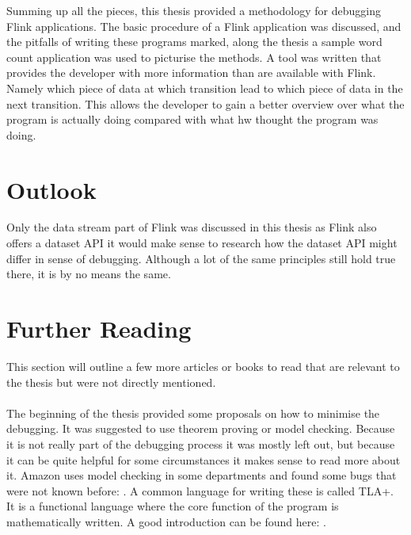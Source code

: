 Summing up all the pieces, this thesis provided a methodology for debugging Flink applications. The basic procedure of a Flink application was discussed, and the pitfalls of writing these programs marked, along the thesis a sample word count application was used to picturise the methods. A tool was written that provides the developer with more information than are available with Flink. Namely which piece of data at which transition lead to which piece of data in the next transition. This allows the developer to gain a better overview over what the program is actually doing compared with what hw thought the program was doing.

\section{Outlook}
Only the data stream part of Flink was discussed in this thesis as Flink also offers a dataset API it would make sense to research how the dataset API might differ in sense of debugging. Although a lot of the same principles still hold true there, it is by no means the same.

\section{Further Reading}
This section will outline a few more articles or books to read that are relevant to the thesis but were not directly mentioned.

\paragraph{} The beginning of the thesis provided some proposals on how to minimise the debugging. It was suggested to use theorem proving or model checking. Because it is not really part of the debugging process it was mostly left out, but because it can be quite helpful for some circumstances it makes sense to read more about it. Amazon uses model checking in some departments and found some bugs that were not known before: \cite{Newcombe:2015:AWS:2749359.2699417}.
A common language for writing these is called TLA+. It is a functional language where the core function of the program is mathematically written. A good introduction can be found here: \cite{Lamport:2002:SST:579617}.
